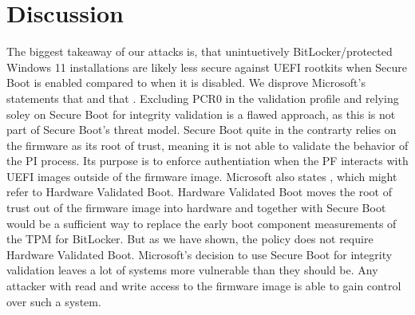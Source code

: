 


\chapter{Discussion}

The biggest takeaway of our attacks is, that unintuetively BitLocker\-/protected Windows 11 installations are likely less secure against \ac{UEFI} rootkits when Secure Boot is enabled compared to when it is disabled.
We disprove Microsoft's statements that  and that .
Excluding \ac{PCR}0 in the validation profile and relying soley on Secure Boot for integrity validation is a flawed approach, as this is not part of Secure Boot's threat model.
Secure Boot quite in the contrarty relies on the firmware as its root of trust, meaning it is not able to validate the behavior of the \ac{PI} process.
Its purpose is to enforce authentiation when the \ac{PF} interacts with \ac{UEFI} images outside of the firmware image.
Microsoft also states , which might refer to Hardware Validated Boot.
Hardware Validated Boot moves the root of trust out of the firmware image into hardware and together with Secure Boot would be a sufficient way to replace the early boot component measurements of the \ac{TPM} for BitLocker.
But as we have shown, the policy does not require Hardware Validated Boot.
Microsoft's decision to use Secure Boot for integrity validation leaves a lot of systems more vulnerable than they should be.
Any attacker with read and write access to the firmware image is able to gain control over such a system.
